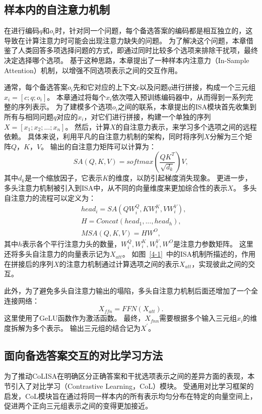 

\subsection{样本内的自注意力机制}
在进行编码$q$和$o_i$时，针对同一个问题，每个备选答案的编码都是相互独立的，这导致在计算注意力时可能会出现注意力缺失的问题。
为了解决这个问题，本章借鉴了人类回答多项选择问题的方式，即通过同时比较多个选项来排除干扰项，最终决定选择哪个选项。
基于这种思路，本章提出了一种样本内注意力（In-Sample Attention）机制，以增强不同选项表示之间的交互作用。

通常，每个备选答案$o_i$先和它对应的上下文$c$以及问题$q$进行拼接，构成一个三元组$x_i=[c;q;o_i]$。
本章通过将每个$x_i$依次喂入预训练编码器中，从而得到一系列完整的序列表示。
为了建模多个选项$o_i$之间的联系，本章提出的ISA模块首先收集到所有与相同问题$q$对应的$x_i$，对它们进行拼接，构建一个单独的序列$X=[x_1;x_2;...;x_n]$。
然后，计算$X$的自注意力表示，来学习多个选项之间的远程依赖。
具体来说，利用平凡的自注意力机制的架构，同时将序列$X$分解为三个矩阵$Q$，$K$，$V$。
输出的自注意力矩阵可以计算为：
\begin{equation}
    SA(Q,K,V)=softmax(\frac {QK^T}{\sqrt{d_k}})V,
\end{equation}
其中$d_k$是一个缩放因子，它表示$K$的维度，以防引起梯度消失现象\cite{vaswani2017attention}。
更进一步，多头注意力机制被引入到ISA中，从不同的向量维度来更加综合性的表示$X$。
多头自注意力的流程可以定义为：
\begin{align}
    & head_i = SA(QW^Q_i,KW^K_i,VW^V_i), \\
    & H = Concat(head_1,...,head_h), \\
    & MSA(Q,K,V) = HW^O,
\end{align}
其中$h$表示各个平行注意力头的数量，$W^Q_i,W^K_i,W^V_i,W^O$是注意力参数矩阵。
这里还将多头自注意力的向量表示记为$X_{att}$。
如图~\ref{4-1}~中的ISA机制所描述的，作用在拼接后的序列$X$的注意力机制通过计算选项之间的表示$X_{att}$，实现彼此之间的交互。

此外，为了避免多头自注意力输出的塌陷\cite{vaswani2017attention,sukhbaatar2019augmenting}，多头自注意力机制后面还增加了一个全连接网络：
\begin{equation}
    X_{ffn}=FFN(X_{att}).
\end{equation}
这里使用了GeLU\cite{hendrycks2016gaussian}函数作为激活函数。
最终，$X_{fnn}$需要根据多个输入三元组$x_i$的维度拆解为多个表示。
输出三元组的结合记为$X^{'}$。

\subsection{面向备选答案交互的对比学习方法}
为了推动CoLISA在明确区分正确答案和干扰选项表示之间的差异方面的表现，本节引入了对比学习（Contrastive Learning，CoL）模块。
受通用对比学习框架\cite{gao2021simcse}的启发，CoL模块旨在通过将同一样本内的所有表示均匀分布在特定的向量空间上，促进两个正向三元组表示之间的变得更加接近。

